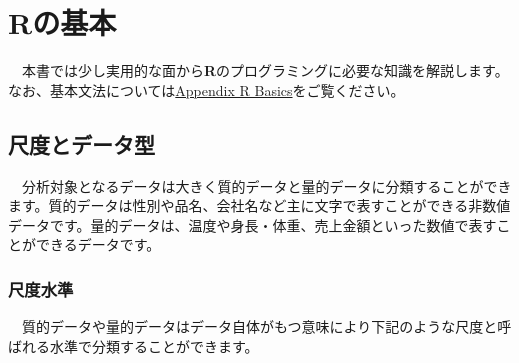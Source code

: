 \documentclass[
  12pt,
]{book}
\begin{document}
\hypertarget{rux306eux57faux672c}{%
\chapter{Rの基本}\label{rux306eux57faux672c}}

　本書では少し実用的な面から\textbf{R}のプログラミングに必要な知識を解説します。なお、基本文法については\protect\hyperlink{Appendix-RBasics}{Appendix R Basics}をご覧ください。

\hypertarget{ux5c3aux5ea6ux3068ux30c7ux30fcux30bfux578b}{%
\section{尺度とデータ型}\label{ux5c3aux5ea6ux3068ux30c7ux30fcux30bfux578b}}

　分析対象となるデータは大きく質的データと量的データに分類することができます。質的データは性別や品名、会社名など主に文字で表すことができる非数値データです。量的データは、温度や身長・体重、売上金額といった数値で表すことができるデータです。

\hypertarget{ux5c3aux5ea6ux6c34ux6e96}{%
\subsection{\texorpdfstring{尺度水準}{尺度水準}}\label{ux5c3aux5ea6ux6c34ux6e96}}

　質的データや量的データはデータ自体がもつ意味により下記のような尺度と呼ばれる水準で分類することができます。
\end{document}
